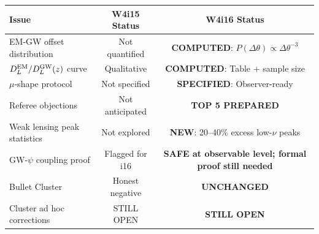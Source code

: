 \documentclass[11pt,a4paper]{article}
\begin{document}
\begin{center}
\begin{tabular}{lcc}
\toprule
Issue & W4i15 Status & W4i16 Status \\
\midrule
EM-GW offset distribution & Not quantified &
  \textbf{COMPUTED}: $P(\Delta\theta) \propto \Delta\theta^{-3}$ \\
$D_L^{\rm EM}/D_L^{\rm GW}(z)$ curve & Qualitative &
  \textbf{COMPUTED}: Table + sample size \\
$\mu$-shape protocol & Not specified &
  \textbf{SPECIFIED}: Observer-ready \\
Referee objections & Not anticipated &
  \textbf{TOP 5 PREPARED} \\
Weak lensing peak statistics & Not explored &
  \textbf{NEW}: 20--40\% excess low-$\nu$ peaks \\
GW-$\psi$ coupling proof & Flagged for i16 &
  \textbf{SAFE at observable level; formal proof still needed} \\
Bullet Cluster & Honest negative & \textbf{UNCHANGED} \\
Cluster ad hoc corrections & STILL OPEN & \textbf{STILL OPEN} \\
\bottomrule
\end{tabular}
\end{center}
\end{document}
